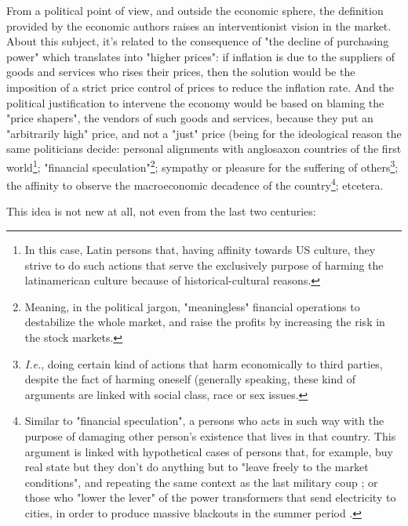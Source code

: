 \documentclass[12pt,a4paper,twoside]{book}
\begin{document}
From a political point of view, and outside the economic sphere, the definition provided by the economic authors raises an interventionist vision in the market. About this subject, it's related to the consequence of "the decline of purchasing power" which translates into "higher prices": if inflation is due to the suppliers of goods and services who rises their prices, then the solution would be the imposition of a strict price control of prices to reduce the inflation rate. And the political justification to intervene the economy would be based on blaming the "price shapers", the vendors of such goods and services, because they put an "arbitrarily high" price, and not a "just" price (being for the ideological reason the same politicians decide: personal alignments with anglosaxon countries of the first world\footnote{In this case, Latin persons that, having affinity towards US culture, they strive to do such actions that serve the exclusively purpose of harming the latinamerican culture because of historical-cultural reasons.}; "financial speculation"\footnote{Meaning, in the political jargon, "meaningless" financial operations to destabilize the whole market, and raise the profits by increasing the risk in the stock markets.}; sympathy or pleasure for the suffering of others\footnote{\textit{I.e.}, doing certain kind of actions that harm economically to third parties, despite the fact of harming oneself (generally speaking, these kind of arguments are linked with social class, race or sex issues.}; the affinity to observe the macroeconomic decadence of the country\footnote{Similar to "financial speculation", a persons who acts in such way with the purpose of damaging other person's existence that lives in that country. This argument is linked with hypothetical cases of persons that, for example, buy real state but they don't do anything but to "leave freely to the market conditions", and repeating the same context as the last military coup \cite{vivienda-ociosa}; or those who "lower the lever" of the power transformers that send electricity to cities, in order to produce massive blackouts in the summer period \cite{corte-luz-2012}.}; etcetera.

This idea is not new at all, not even from the last two centuries:
\end{document}
